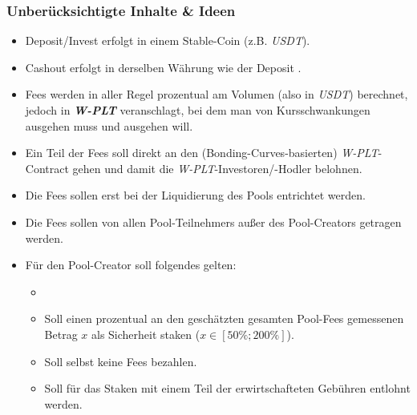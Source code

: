 \subsubsection{Unberücksichtigte Inhalte \& Ideen}

\vspace{0.3cm}
\vspace{0.5cm}

\begin{Praemisse}

\begin{itemize}
	\item Deposit/Invest erfolgt in einem Stable-Coin (z.B. \textit{USDT}). 
	\item Cashout erfolgt in derselben Währung wie der Deposit . 
	\item Fees werden in aller Regel prozentual am Volumen (also in \textit{USDT}) berechnet, jedoch in \textbf{\textit{W-PLT}} veranschlagt, bei dem man von Kursschwankungen ausgehen muss und ausgehen will. 
	\item Ein Teil der Fees soll direkt an den (Bonding-Curves-basierten) \textit{W-PLT}-Contract gehen und damit die \textit{W-PLT}-Investoren/-Hodler belohnen.
	\item Die Fees sollen  erst bei der Liquidierung des Pools entrichtet werden.
	\item Die Fees sollen von allen Pool-Teilnehmers außer des Pool-Creators getragen werden.
	\item Für den Pool-Creator soll folgendes gelten:
	\begin{itemize}
		\item {}
		\item Soll einen prozentual an den geschätzten gesamten Pool-Fees gemessenen Betrag $x$ als Sicherheit staken ($x \in [50 \%; 200 \%]$). 
		\item Soll selbst keine Fees bezahlen.
		\item Soll für das Staken mit einem Teil der erwirtschafteten Gebühren entlohnt werden.
	\end{itemize}
\end{itemize}

\end{Praemisse}

